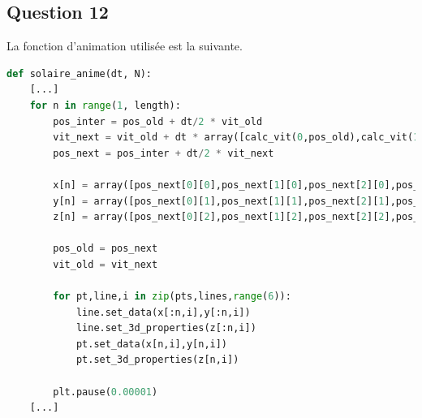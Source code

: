 \documentclass{article}
\begin{document}
\subsection*{Question 12}
La fonction d'animation utilisée est la suivante.
\begin{lstlisting}[language=Python]
def solaire_anime(dt, N):
    [...]
    for n in range(1, length):
        pos_inter = pos_old + dt/2 * vit_old
        vit_next = vit_old + dt * array([calc_vit(0,pos_old),calc_vit(1,pos_old),calc_vit(2,pos_old),calc_vit(3,pos_old),calc_vit(4,pos_old),calc_vit(5,pos_old)])
        pos_next = pos_inter + dt/2 * vit_next
        
        x[n] = array([pos_next[0][0],pos_next[1][0],pos_next[2][0],pos_next[3][0],pos_next[4][0],pos_next[5][0]])
        y[n] = array([pos_next[0][1],pos_next[1][1],pos_next[2][1],pos_next[3][1],pos_next[4][1],pos_next[5][1]])
        z[n] = array([pos_next[0][2],pos_next[1][2],pos_next[2][2],pos_next[3][2],pos_next[4][2],pos_next[5][2]])
        
        pos_old = pos_next
        vit_old = vit_next
        
        for pt,line,i in zip(pts,lines,range(6)):
            line.set_data(x[:n,i],y[:n,i])
            line.set_3d_properties(z[:n,i])
            pt.set_data(x[n,i],y[n,i])
            pt.set_3d_properties(z[n,i])
            
        plt.pause(0.00001)
    [...]
\end{lstlisting}
\end{document}
